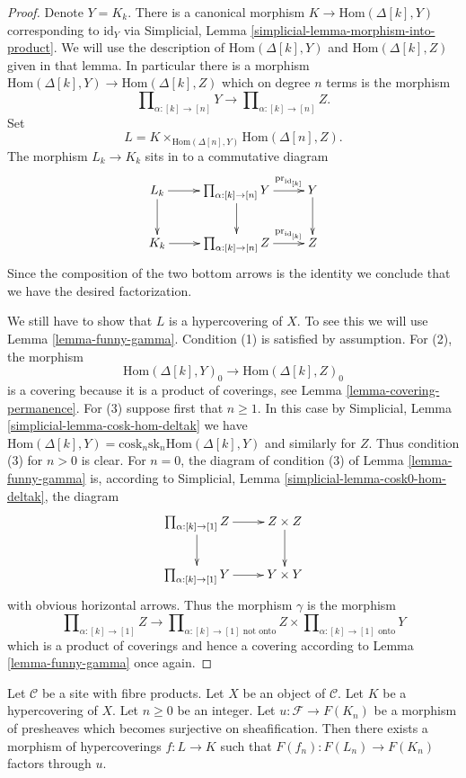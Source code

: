 \begin{proof}
Denote $Y = K_k$. There is a canonical morphism
$K \to \text{Hom}(\Delta[k], Y)$ corresponding to
$\text{id}_Y$ via
Simplicial, Lemma \ref{simplicial-lemma-morphism-into-product}.
We will use the description of $\text{Hom}(\Delta[k], Y)$
and $\text{Hom}(\Delta[k], Z)$ given in that lemma. In particular
there is a morphism $\text{Hom}(\Delta[k], Y) \to \text{Hom}(\Delta[k], Z)$
which on degree $n$ terms is the morphism
$$
\prod\nolimits_{\alpha : [k] \to [n]} Y
\longrightarrow
\prod\nolimits_{\alpha : [k] \to [n]} Z.
$$
Set
$$
L =
K
\times_{\text{Hom}(\Delta[n], Y)}
\text{Hom}(\Delta[n], Z).
$$
The morphism $L_k \to K_k$ sits in to a commutative diagram
$$
\xymatrix{
L_k \ar[r] \ar[d] &
\prod_{\alpha : [k] \to [n]} Y \ar[r]^-{\text{pr}_{\text{id}_{[k]}}} \ar[d] &
Y \ar[d] \\
K_k \ar[r] &
\prod_{\alpha : [k] \to [n]} Z \ar[r]^-{\text{pr}_{\text{id}_{[k]}}} &
Z
}
$$
Since the composition of the two bottom arrows is the identity
we conclude that we have the desired factorization.

\medskip\noindent
We still have to show that $L$ is a hypercovering of $X$.
To see this we will use Lemma \ref{lemma-funny-gamma}.
Condition (1) is satisfied by assumption.
For (2), the morphism
$$
\text{Hom}(\Delta[k], Y)_0 \to \text{Hom}(\Delta[k], Z)_0
$$
is a covering because it is a product of coverings,
see Lemma \ref{lemma-covering-permanence}. For (3)
suppose first that $n \geq 1$. In this case by
Simplicial, Lemma \ref{simplicial-lemma-cosk-hom-deltak}
we have
$\text{Hom}(\Delta[k], Y) =
\text{cosk}_n \text{sk}_n \text{Hom}(\Delta[k], Y)$
and similarly for $Z$. Thus condition (3) for $n > 0$
is clear. For $n = 0$, the diagram of condition
(3) of Lemma \ref{lemma-funny-gamma} is,
according to Simplicial, Lemma \ref{simplicial-lemma-cosk0-hom-deltak},
the diagram
$$
\xymatrix{
\prod\nolimits_{\alpha : [k] \to [1]} Z \ar[r] \ar[d] &
Z \times Z \ar[d] \\
\prod\nolimits_{\alpha : [k] \to [1]} Y \ar[r] &
Y \times Y
}
$$
with obvious horizontal arrows. Thus the morphism $\gamma$
is the morphism
$$
\prod\nolimits_{\alpha : [k] \to [1]} Z
\longrightarrow
\prod\nolimits_{\alpha : [k] \to [1]\text{ not onto}} Z
\times
\prod\nolimits_{\alpha : [k] \to [1]\text{ onto}} Y
$$
which is a product of coverings and hence a covering
according to Lemma \ref{lemma-funny-gamma} once again.
\end{proof}

\begin{lemma}
\label{lemma-covering-sheaf}
Let $\mathcal{C}$ be a site with fibre products.
Let $X$ be an object of $\mathcal{C}$.
Let $K$ be a hypercovering of $X$.
Let $n \geq 0$ be an integer.
Let $u : \mathcal{F} \to F(K_n)$ be a morphism
of presheaves which becomes surjective
on sheafification.
Then there exists a morphism of hypercoverings
$f: L \to K$ such that $F(f_n) : F(L_n) \to F(K_n)$
factors through $u$.
\end{lemma}

